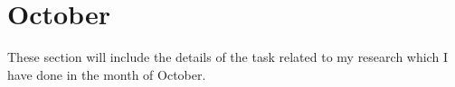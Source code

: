 \chapter{October}
\label{chap:Oct}


These section will include the details of the task related to my research which I have done in the month of October.





